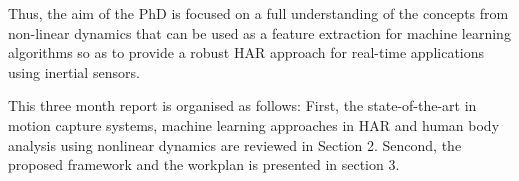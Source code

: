 Thus, the aim of the PhD is focused on a full understanding 
of the concepts from non-linear dynamics that can be used 
as a feature extraction for machine learning algorithms so as to provide 
a robust HAR approach for real-time applications using inertial sensors.
% 
%   


This three month report is organised as follows: First,
the state-of-the-art in motion capture systems, machine learning approaches in HAR
and human body analysis using nonlinear dynamics are reviewed in Section 2. Sencond, 
the proposed framework and the workplan is presented in section 3.



